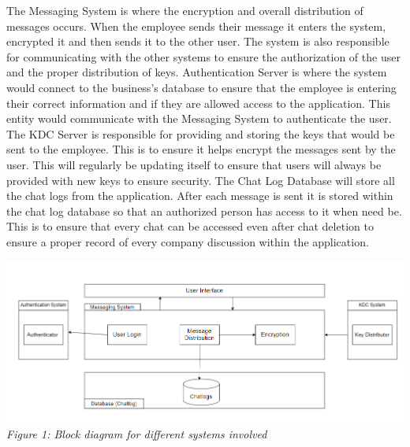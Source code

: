 \documentclass[]{article}
\begin{document}
\indent The Messaging System is where the encryption and overall distribution of messages occurs. When the employee sends their message it enters the system, encrypted it and then sends it to the other user. The system is also responsible for communicating with the other systems to ensure the authorization of the user and the proper distribution of keys.
\newline
\newline
\indent Authentication Server is where the system would connect to the business’s database to ensure that the employee is entering their correct information and if they are allowed access to the application. This entity would communicate with the Messaging System to authenticate the user.
\newline
\newline
\indent The KDC Server is responsible for providing and storing the keys that would be sent to the employee. This is to ensure it helps encrypt the messages sent by the user. This will regularly be updating itself to ensure that users will always be provided with new keys to ensure security.
\newline
\newline
\indent The Chat Log Database will store all the chat logs from the application. After each message is sent it is stored within the chat log database so that an authorized person has access to it when need be. This is to ensure that every chat can be accessed even after chat deletion to ensure a proper record of every company discussion within the application.
\newline
\begin{center}
    \includegraphics{Graphics/blockdiagram.png}\\
    \emph{Figure 1: Block diagram for different systems involved}
\end{center}
\end{document}
